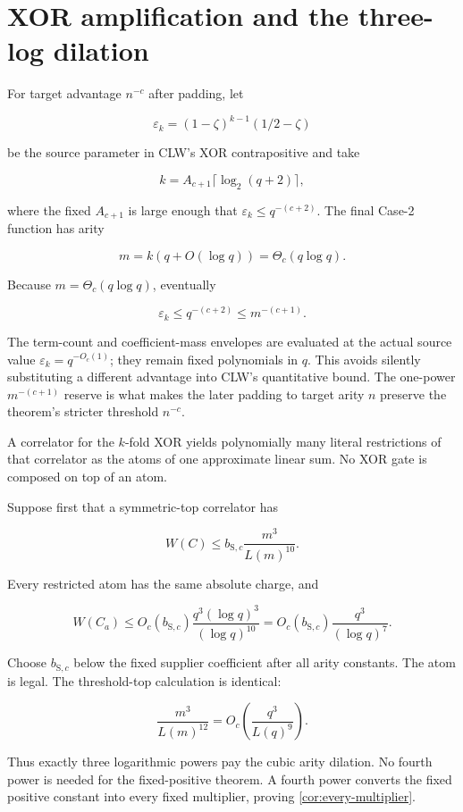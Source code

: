 \documentclass[11pt,letterpaper]{article}
\newcommand{\cref}[1]{\ref{#1}}
\theoremstyle{definition}
\theoremstyle{remark}
\begin{document}
\section{XOR amplification and the three-log
dilation}\label{6-xor-amplification-and-the-three-log-dilation}

For target advantage \(n^{-c}\) after padding, let

\[
\varepsilon_k=(1-\zeta)^{k-1}(1/2-\zeta)
\]

be the source parameter in CLW's XOR contrapositive and
take

\[
k=A_{c+1}\lceil\log_2(q+2)\rceil,
\]

where the fixed \(A_{c+1}\) is large enough that
\(\varepsilon_k\le q^{-(c+2)}\). The final Case-2 function has arity

\[
m=k(q+O(\log q))=\Theta_c(q\log q).
\]

Because \(m=\Theta_c(q\log q)\), eventually

\[
\varepsilon_k
\le q^{-(c+2)}
\le m^{-(c+1)}.
\]

The term-count and coefficient-mass envelopes are evaluated at the
actual source value \(\varepsilon_k=q^{-O_c(1)}\); they remain fixed
polynomials in \(q\). This avoids silently substituting a different
advantage into CLW's quantitative bound. The one-power
\(m^{-(c+1)}\) reserve is what makes the later padding to target arity
\(n\) preserve the theorem's stricter threshold
\(n^{-c}\).

A correlator for the \(k\)-fold XOR yields polynomially many literal
restrictions of that correlator as the atoms of one approximate linear
sum. No XOR gate is composed on top of an atom.

Suppose first that a symmetric-top correlator has

\[
W(C)\le b_{\mathrm S,c}\frac{m^3}{L(m)^{10}}.
\]

Every restricted atom has the same absolute charge, and

\[
W(C_a)
\le
O_c(b_{\mathrm S,c})
\frac{q^3(\log q)^3}{(\log q)^{10}}
{}={}
O_c(b_{\mathrm S,c})
\frac{q^3}{(\log q)^7}.
\]

Choose \(b_{\mathrm S,c}\) below the fixed supplier coefficient after
all arity constants. The atom is legal. The threshold-top calculation is
identical:

\[
\frac{m^3}{L(m)^{12}}
{}={}
O_c\left(\frac{q^3}{L(q)^9}\right).
\]

Thus exactly three logarithmic powers pay the cubic arity dilation. No
fourth power is needed for the fixed-positive theorem. A fourth power
converts the fixed positive constant into every fixed multiplier,
proving \cref{cor:every-multiplier}.
\end{document}
